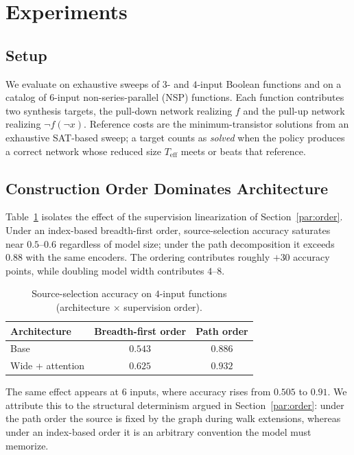 \documentclass[11pt, a4paper]{article}
\theoremstyle{plain}
\theoremstyle{definition}
\theoremstyle{remark}
\begin{document}
\section{Experiments}
\label{sec:experiments}

\subsection{Setup}

We evaluate on exhaustive sweeps of $3$- and $4$-input Boolean functions
and on a catalog of $6$-input non-series-parallel (NSP) functions.  Each
function contributes two synthesis targets, the pull-down network
realizing $f$ and the pull-up network realizing $\neg f(\neg x)$.
Reference costs are the minimum-transistor solutions from an exhaustive
SAT-based sweep; a target counts as \emph{solved} when the policy
produces a correct network whose reduced size $T_{\mathrm{eff}}$ meets or
beats that reference.

\subsection{Construction Order Dominates Architecture}

Table~\ref{tab:order} isolates the effect of the supervision
linearization of Section~\ref{par:order}.  Under an index-based
breadth-first order, source-selection accuracy saturates near $0.5$--$0.6$
regardless of model size; under the path decomposition it exceeds $0.88$
with the same encoders.  The ordering contributes roughly $+30$ accuracy
points, while doubling model width contributes $4$--$8$.

\begin{table}[t]
\centering
\caption{Source-selection accuracy on $4$-input functions
(architecture $\times$ supervision order).}
\label{tab:order}
\begin{tabular}{lcc}
\toprule
Architecture & Breadth-first order & Path order \\
\midrule
Base   & $0.543$ & $0.886$ \\
Wide + attention & $0.625$ & $\mathbf{0.932}$ \\
\bottomrule
\end{tabular}
\end{table}

The same effect appears at $6$ inputs, where accuracy rises from $0.505$
to $0.91$.  We attribute this to the structural determinism argued in
Section~\ref{par:order}: under the path order the source is fixed by the
graph during walk extensions, whereas under an index-based order it is an
arbitrary convention the model must memorize.
\end{document}
